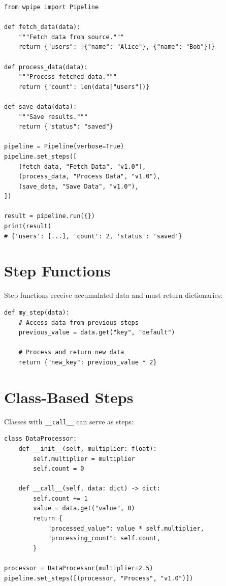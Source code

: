 \documentclass[12pt,a4paper]{report}
\newcommand{\code}[1]{\texttt{\fontfamily{pcr}\selectfont #1}}
\begin{document}
\begin{lstlisting}[caption={Basic Pipeline Creation}, label={lst:basic-pipeline}]
from wpipe import Pipeline

def fetch_data(data):
    """Fetch data from source."""
    return {"users": [{"name": "Alice"}, {"name": "Bob"}]}

def process_data(data):
    """Process fetched data."""
    return {"count": len(data["users"])}

def save_data(data):
    """Save results."""
    return {"status": "saved"}

pipeline = Pipeline(verbose=True)
pipeline.set_steps([
    (fetch_data, "Fetch Data", "v1.0"),
    (process_data, "Process Data", "v1.0"),
    (save_data, "Save Data", "v1.0"),
])

result = pipeline.run({})
print(result)
# {'users': [...], 'count': 2, 'status': 'saved'}
\end{lstlisting}

\section{Step Functions}

Step functions receive accumulated data and must return dictionaries:

\begin{lstlisting}[caption={Step Function Definition}, label={lst:step-function}]
def my_step(data):
    # Access data from previous steps
    previous_value = data.get("key", "default")

    # Process and return new data
    return {"new_key": previous_value * 2}
\end{lstlisting}

\section{Class-Based Steps}

Classes with \code{\_\_call\_\_} can serve as steps:

\begin{lstlisting}[caption={Class-Based Step}, label={lst:class-step}]
class DataProcessor:
    def __init__(self, multiplier: float):
        self.multiplier = multiplier
        self.count = 0

    def __call__(self, data: dict) -> dict:
        self.count += 1
        value = data.get("value", 0)
        return {
            "processed_value": value * self.multiplier,
            "processing_count": self.count,
        }

processor = DataProcessor(multiplier=2.5)
pipeline.set_steps([(processor, "Process", "v1.0")])
\end{lstlisting}
\end{document}
